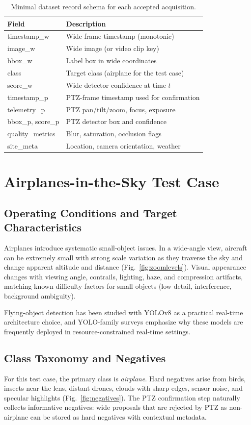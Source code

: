 \documentclass[conf]{new-aiaa}
\begin{document}
{\begin{table}[t]
\centering
\caption{Minimal dataset record schema for each accepted acquisition.}
\label{tab:schema}
\begin{tabular}{@{}ll@{}}
\toprule
Field & Description \\
\midrule
timestamp\_w & Wide-frame timestamp (monotonic) \\
image\_w & Wide image (or video clip key) \\
bbox\_w & Label box in wide coordinates \\
class & Target class (airplane for the test case) \\
score\_w & Wide detector confidence at time $t$ \\
timestamp\_p & PTZ-frame timestamp used for confirmation \\
telemetry\_p & PTZ pan/tilt/zoom, focus, exposure \\
bbox\_p, score\_p & PTZ detector box and confidence \\
quality\_metrics & Blur, saturation, occlusion flags \\
site\_meta & Location, camera orientation, weather \\
\bottomrule
\end{tabular}
\end{table}

\section{Airplanes-in-the-Sky Test Case}
\subsection{Operating Conditions and Target Characteristics}
Airplanes introduce systematic small-object issues. In a wide-angle view, aircraft can be extremely small with strong scale variation as they traverse the sky and change apparent altitude and distance (Fig.~\ref{fig:zoomlevels}). Visual appearance changes with viewing angle, contrails, lighting, haze, and compression artifacts, matching known difficulty factors for small objects (low detail, interference, background ambiguity).
\par
Flying-object detection has been studied with YOLOv8 as a practical real-time architecture choice, and YOLO-family surveys emphasize why these models are frequently deployed in resource-constrained real-time settings.



\subsection{Class Taxonomy and Negatives}
For this test case, the primary class is \textit{airplane}. Hard negatives arise from birds, insects near the lens, distant drones, clouds with sharp edges, sensor noise, and specular highlights (Fig.~\ref{fig:negatives}). The PTZ confirmation step naturally collects informative negatives: wide proposals that are rejected by PTZ as non-airplane can be stored as hard negatives with contextual metadata.

}
\end{document}
